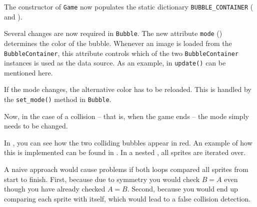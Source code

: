 The constructor of \texttt{Game} now populates the static dictionary \texttt{BUBBLE\_CONTAINER} ( and ).

\newpage
{}

Several changes are now required in \texttt{Bubble}. The new attribute \texttt{mode} () determines the color of the bubble. Whenever an image is loaded from the \texttt{Bubble\-Con\-tainer}, this attribute controls which of the two \texttt{Bubble\-Con\-tainer} instances is used as the data source. As an example,  in \texttt{update()} can be mentioned here.


If the mode changes, the alternative color has to be reloaded. This is handled by the \texttt{set\_mode()} method in \texttt{Bubble}.


\newpage
\begin{figure}%
	\begin{center}%
		\vspace{-1.0em}%
	\end{center}%
\end{figure}%
Now, in the case of a collision -- that is, when the game ends -- the mode simply needs to be changed.

In , you can see how the two colliding bubbles appear in red. An example of how this is implemented can be found in . In a nested \forSchleife, all sprites are iterated over.

A naive approach would cause problems if both loops compared all sprites from start to finish. First, because due to symmetry you would check $B=A$ even though you have already checked $A=B$. Second, because you would end up comparing each sprite with itself, which would lead to a false collision detection.


